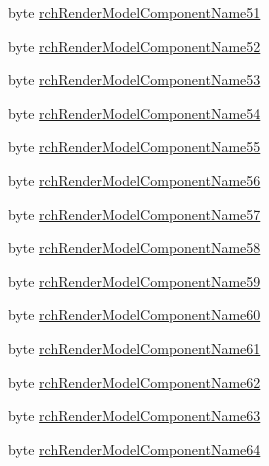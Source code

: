 \begin{DoxyCompactItemize}
\item 
byte \mbox{\hyperlink{struct_valve_1_1_v_r_1_1_input_origin_info__t_a3e9a7b6ab5a095d3317a4534509c5730}{rch\+Render\+Model\+Component\+Name51}}
\item 
byte \mbox{\hyperlink{struct_valve_1_1_v_r_1_1_input_origin_info__t_a0298a2cfea35f410c998b953b7d86638}{rch\+Render\+Model\+Component\+Name52}}
\item 
byte \mbox{\hyperlink{struct_valve_1_1_v_r_1_1_input_origin_info__t_ab908054b0da08d08c22be6dec6d8f18f}{rch\+Render\+Model\+Component\+Name53}}
\item 
byte \mbox{\hyperlink{struct_valve_1_1_v_r_1_1_input_origin_info__t_a9bf0b5ff2826ea9790f06f4625810b0f}{rch\+Render\+Model\+Component\+Name54}}
\item 
byte \mbox{\hyperlink{struct_valve_1_1_v_r_1_1_input_origin_info__t_aca528d813355d3e1a154827433940af2}{rch\+Render\+Model\+Component\+Name55}}
\item 
byte \mbox{\hyperlink{struct_valve_1_1_v_r_1_1_input_origin_info__t_abeaf7130c587c4a91a8334fd583b3c34}{rch\+Render\+Model\+Component\+Name56}}
\item 
byte \mbox{\hyperlink{struct_valve_1_1_v_r_1_1_input_origin_info__t_a63e2f264777913491059feb544504799}{rch\+Render\+Model\+Component\+Name57}}
\item 
byte \mbox{\hyperlink{struct_valve_1_1_v_r_1_1_input_origin_info__t_a4a28d2b7cf759d8273052399fd063256}{rch\+Render\+Model\+Component\+Name58}}
\item 
byte \mbox{\hyperlink{struct_valve_1_1_v_r_1_1_input_origin_info__t_a6d2b7c9039d796bf3c6abe43357eb970}{rch\+Render\+Model\+Component\+Name59}}
\item 
byte \mbox{\hyperlink{struct_valve_1_1_v_r_1_1_input_origin_info__t_a27dd2f8286f1301a32e553e9a86f2118}{rch\+Render\+Model\+Component\+Name60}}
\item 
byte \mbox{\hyperlink{struct_valve_1_1_v_r_1_1_input_origin_info__t_abfcf2f5f3101dfde96bdef95b360c677}{rch\+Render\+Model\+Component\+Name61}}
\item 
byte \mbox{\hyperlink{struct_valve_1_1_v_r_1_1_input_origin_info__t_a03b8729faace610433fc98f04b2d8118}{rch\+Render\+Model\+Component\+Name62}}
\item 
byte \mbox{\hyperlink{struct_valve_1_1_v_r_1_1_input_origin_info__t_a52206179b986f57f54c6cd88dacc2fc7}{rch\+Render\+Model\+Component\+Name63}}
\item 
byte \mbox{\hyperlink{struct_valve_1_1_v_r_1_1_input_origin_info__t_a7fb47f2e8c875fa51defe0f005e99988}{rch\+Render\+Model\+Component\+Name64}}

\end{DoxyCompactItemize}
